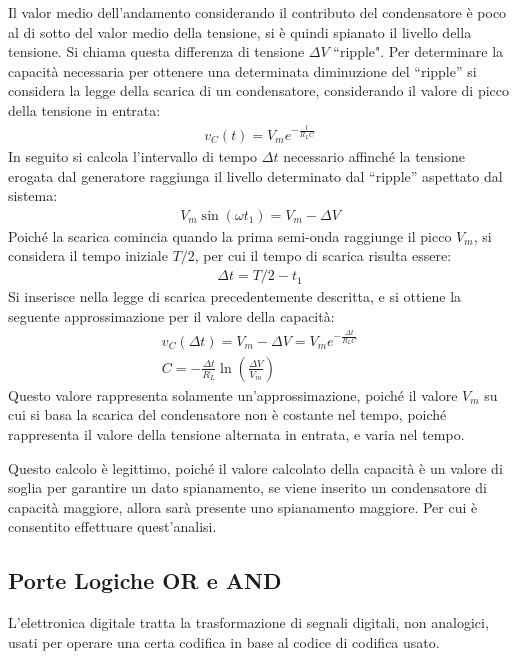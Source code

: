 \documentclass{article}
\numberwithin{equation}{subsection}
\begin{document}
Il valor medio dell'andamento considerando il contributo del condensatore è poco al di sotto del valor medio della tensione, si è quindi spianato il livello della tensione. 
Si chiama questa differenza di tensione $\Delta V$ ``ripple". 
Per determinare la capacità necessaria per ottenere una determinata diminuzione del ``ripple'' si considera la legge della scarica di un condensatore, 
considerando il valore di picco della tensione in entrata:
\begin{gather*}
    v_C(t)=V_me^{-\frac{t}{R_LC}}
\end{gather*}
In seguito si calcola l'intervallo di tempo $\Delta t$ necessario affinché la tensione erogata dal generatore raggiunga il livello determinato 
dal ``ripple'' aspettato dal sistema:
\begin{gather*}
    V_m\sin(\omega t_1)=V_m-\Delta V
\end{gather*}
Poiché la scarica comincia quando la prima semi-onda raggiunge il picco $V_m$, si considera il tempo iniziale $T/2$, per cui il tempo di scarica 
risulta essere:
\begin{gather*}
    \Delta t= T/2-t_1
\end{gather*}
Si inserisce nella legge di scarica precedentemente descritta, e si ottiene la seguente approssimazione per il valore della capacità:
\begin{gather*}
    v_C(\Delta t)=V_m-\Delta V=V_me^{-\frac{\Delta t}{R_LC}}\\
    C=-\displaystyle\frac{\Delta t}{R_L}\ln\left(\frac{\Delta V}{V_m}\right)
\end{gather*}
Questo valore rappresenta solamente un'approssimazione, poiché il valore $V_m$ su cui si basa la scarica del condensatore non è costante nel tempo, 
poiché rappresenta il valore della tensione alternata in entrata, e varia nel tempo. 

Questo calcolo è legittimo, poiché il valore calcolato della capacità è un valore di soglia per garantire un dato spianamento, se viene inserito 
un condensatore di capacità maggiore, allora sarà presente uno spianamento maggiore. Per cui è consentito effettuare quest'analisi. 

\subsection{Porte Logiche OR e AND}

L'elettronica digitale tratta la trasformazione di segnali digitali, non analogici, usati per operare una certa codifica in base al codice di codifica usato. 
\end{document}
